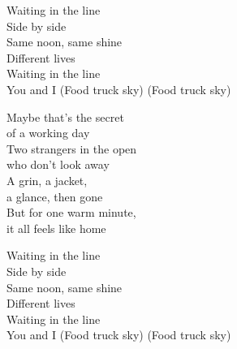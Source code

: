 \begin{lyrics}
Waiting in the line\\
Side by side\\
Same noon, same shine\\
Different lives\\
Waiting in the line\\
You and I
(Food truck sky)
(Food truck sky)

Maybe that’s the secret\\
of a working day\\
Two strangers in the open\\
who don’t look away\\
A grin, a jacket,\\
a glance, then gone\\
But for one warm minute,\\
it all feels like home

Waiting in the line\\
Side by side\\
Same noon, same shine\\
Different lives\\
Waiting in the line\\
You and I
(Food truck sky)
(Food truck sky)

\end{lyrics}

